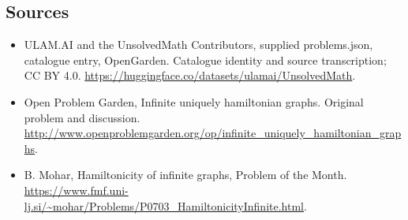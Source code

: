 \documentclass[11pt,a4paper]{article}
\begin{document}
\subsection{Sources}
\begin{itemize}
\item[S1] ULAM.AI and the UnsolvedMath Contributors, supplied problems.json, catalogue entry, OpenGarden. Catalogue identity and source transcription; CC BY 4.0.
\url{https://huggingface.co/datasets/ulamai/UnsolvedMath}.
\item[S2] Open Problem Garden, Infinite uniquely hamiltonian graphs. Original problem and discussion.
\url{http://www.openproblemgarden.org/op/infinite_uniquely_hamiltonian_graphs}.
\item[S3] B. Mohar, Hamiltonicity of infinite graphs, Problem of the Month.
\url{https://www.fmf.uni-lj.si/~mohar/Problems/P0703_HamiltonicityInfinite.html}.
\end{itemize}
\end{document}

